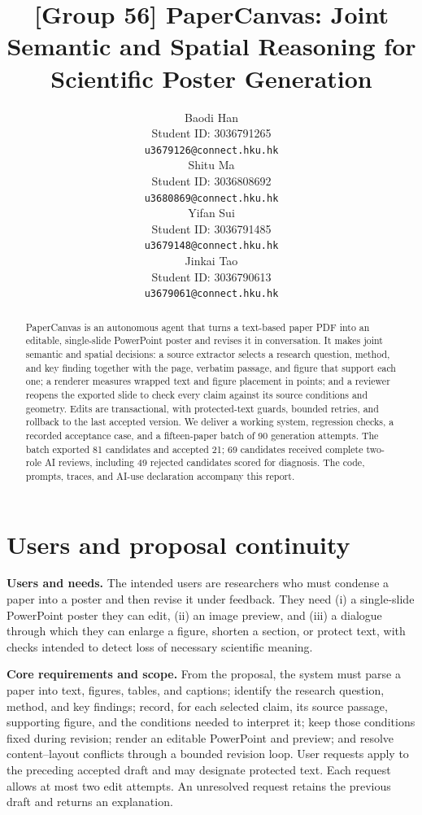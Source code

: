 \documentclass{article}
\title{[Group 56] PaperCanvas: Joint Semantic and Spatial Reasoning for Scientific Poster Generation}
\author{%
  Baodi Han \\
  Student ID: 3036791265 \\
  \texttt{u3679126@connect.hku.hk} \\
  \And
  Shitu Ma \\
  Student ID: 3036808692 \\
  \texttt{u3680869@connect.hku.hk} \\
  \And
  Yifan Sui \\
  Student ID: 3036791485 \\
  \texttt{u3679148@connect.hku.hk} \\
  \And
  Jinkai Tao \\
  Student ID: 3036790613 \\
  \texttt{u3679061@connect.hku.hk} \\
}
\begin{document}
\maketitle

\begin{abstract}
PaperCanvas is an autonomous agent that turns a text-based paper PDF into an editable, single-slide PowerPoint poster and revises it in conversation. It makes joint semantic and spatial decisions: a source extractor selects a research question, method, and key finding together with the page, verbatim passage, and figure that support each one; a renderer measures wrapped text and figure placement in points; and a reviewer reopens the exported slide to check every claim against its source conditions and geometry. Edits are transactional, with protected-text guards, bounded retries, and rollback to the last accepted version. We deliver a working system, regression checks, a recorded acceptance case, and a fifteen-paper batch of 90 generation attempts. The batch exported 81 candidates and accepted 21; 69 candidates received complete two-role AI reviews, including 49 rejected candidates scored for diagnosis. The code, prompts, traces, and AI-use declaration accompany this report.
\end{abstract}

\section{Users and proposal continuity}

\textbf{Users and needs.} The intended users are researchers who must condense a paper into a poster and then revise it under feedback. They need (i) a single-slide PowerPoint poster they can edit, (ii) an image preview, and (iii) a dialogue through which they can enlarge a figure, shorten a section, or protect text, with checks intended to detect loss of necessary scientific meaning.

\textbf{Core requirements and scope.} From the proposal, the system must parse a paper into text, figures, tables, and captions; identify the research question, method, and key findings; record, for each selected claim, its source passage, supporting figure, and the conditions needed to interpret it; keep those conditions fixed during revision; render an editable PowerPoint and preview; and resolve content--layout conflicts through a bounded revision loop. User requests apply to the preceding accepted draft and may designate protected text. Each request allows at most two edit attempts. An unresolved request retains the previous draft and returns an explanation.
\end{document}

